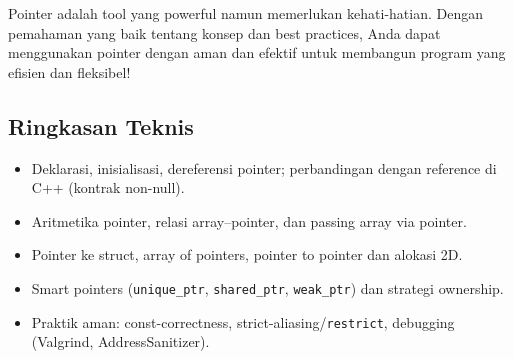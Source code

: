 \documentclass[../main.tex]{subfiles}
\begin{document}
Pointer adalah tool yang powerful namun memerlukan kehati-hatian. Dengan pemahaman yang baik tentang konsep dan best practices, Anda dapat menggunakan pointer dengan aman dan efektif untuk membangun program yang efisien dan fleksibel!

\subsection{Ringkasan Teknis}

\begin{itemize}
  \item Deklarasi, inisialisasi, dereferensi pointer; perbandingan dengan reference di C++ (kontrak non-null).
  \item Aritmetika pointer, relasi array–pointer, dan passing array via pointer.
  \item Pointer ke struct, array of pointers, pointer to pointer dan alokasi 2D.
  \item Smart pointers (\texttt{unique\_ptr}, \texttt{shared\_ptr}, \texttt{weak\_ptr}) dan strategi ownership.
  \item Praktik aman: const-correctness, strict-aliasing/\texttt{restrict}, debugging (Valgrind, AddressSanitizer).
\end{itemize}
\end{document}
